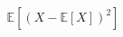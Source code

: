 \documentclass[preview]{standalone}
\begin{document}
\begin{align*}
\mathbb{E}\left[(X - \mathbb{E}[X])^2\right]
\end{align*}
\end{document}

